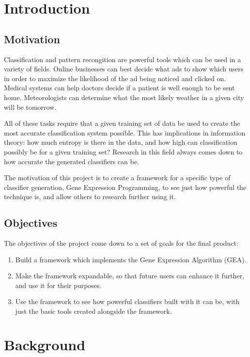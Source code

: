 \documentclass[a4paper,11pt]{report}
\begin{document}
\chapter{Introduction}

\section{Motivation}

Classification and pattern recongition are powerful tools which can be used in a variety of 
fields. Online businesses can best decide what ads to show which users in order to maximize
the likelihood of the ad being noticed and clicked on. Medical systems can help doctors 
decide if a patient is well enough to be sent home. Meteorologists can determine what the 
most likely weather in a given city will be tomorrow. 

All of these tasks require that a given 
training set of data be used to create the most accurate classification system possible. 
This has implications in information theory: how much entropy is there in the data, and 
how high can classification possibly be for a given training set? Research in this field 
always comes down to how accurate the generated classifiers can be. 

The motivation of this project is to create a framework for a specific type of classifier
generation, Gene Expression Programming, to see just how powerful the technique is, and 
allow others to research further using it.

\section{Objectives}

The objectives of the project come down to a set of goals for the final product:

\begin{enumerate}
 \item Build a framework which implements the Gene Expression Algorithm (GEA).
 \item Make the framework expandable, so that future users can enhance it further, and use it for their purposes. 
 \item Use the framework to see how powerful classifiers built with it can be, with just the basic tools created
alongside the framework. 
\end{enumerate}

\chapter{Background}
\end{document}

